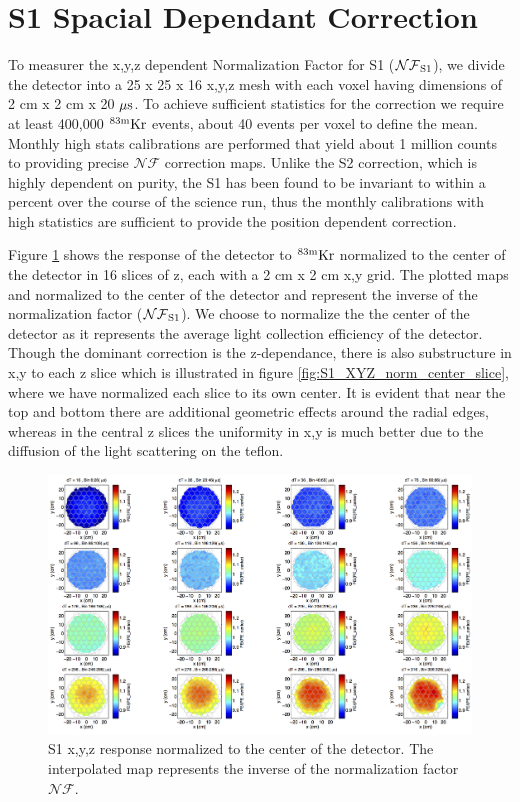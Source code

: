 \section{S1 Spacial Dependant Correction}

To measurer the x,y,z dependent Normalization Factor for S1 ($\rm \mathcal{NF}_{S1}$), we divide the detector into a 25 x 25 x 16 x,y,z mesh with each voxel having dimensions of 2 cm x 2 cm x 20 $\rm \mu s$. To achieve sufficient statistics for the correction we require at least 400,000 $\rm^{83m}Kr$ events, about 40 events per voxel to define the mean. Monthly high stats calibrations are performed that yield about 1 million counts to providing precise $\mathcal{NF}$ correction maps. Unlike the S2 correction, which is highly dependent on purity, the S1 has been found to be invariant to within a percent over the course of the science run, thus the monthly calibrations with high statistics are sufficient to provide the position dependent correction.

Figure \ref{fig:S1_XYZ_norm_center} shows the response of the detector to $\rm^{83m}Kr$ normalized to the center of the detector in 16 slices of z, each with a 2 cm x 2 cm x,y grid. The plotted maps and normalized to the center of the detector and represent the inverse of the normalization factor ($\rm \mathcal{NF}_{S1}$). We choose to normalize the the center of the detector as it represents the average light collection efficiency of the detector. Though the dominant correction is the z-dependance, there is also substructure in x,y to each z slice which is illustrated in figure \ref{fig:S1_XYZ_norm_center_slice}, where we have normalized each slice to its own center. It is evident that near the top and bottom there are additional geometric effects around the radial edges, whereas in the central z slices the uniformity in x,y is much better due to the diffusion of the light scattering on the teflon.

\renewcommand{\baselinestretch}{1}
\small\normalsize
\begin{figure}\centering
\includegraphics[width=230mm]{Chapter_XYZ_Corr/Thesis_Corr_Plots/S1_XYZ_Kr_norm_center_crop_80.png}
\caption{S1 x,y,z response normalized to the center of the detector. The interpolated map represents the inverse of the normalization factor $\mathcal{NF}$. }
\label{fig:S1_XYZ_norm_center}
\end{figure}
\renewcommand{\baselinestretch}{2}
\small\normalsize

